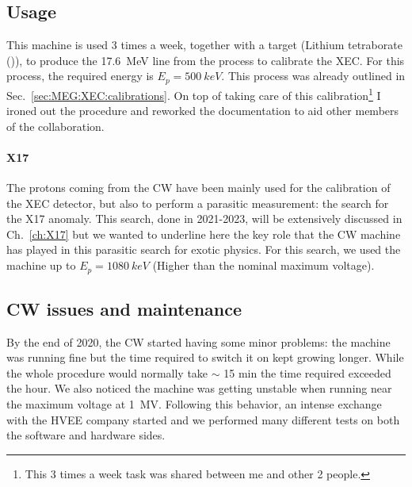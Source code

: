 \begin{refsection}
    \subsection{Usage}
        This machine is used 3 times a week, together with a  target (Lithium tetraborate ()), to produce the \SI{17.6}{MeV} line from the  process to calibrate the XEC. For this process, the required energy is $E_p=\SI{500}{keV}$.
        This process was already outlined in Sec.~\ref{sec:MEG:XEC:calibrations}.
        On top of taking care of this calibration\footnote {This 3 times a week task was shared between me and other 2 people.} 
        I ironed out the procedure and reworked the documentation to aid other members of the collaboration.
        
        \paragraph{X17} The protons coming from the CW have been mainly used for the calibration of the XEC detector, but also to perform a parasitic measurement: the search for the X17 anomaly.
        This search, done in 2021-2023, will be extensively discussed in Ch.~\ref{ch:X17} but we wanted to underline here the key role that the CW machine has played in this parasitic search for exotic physics. 
        For this search, we used the machine up to $E_p=\SI{1080}{keV}$ (Higher than the nominal maximum voltage).

    \subsection{CW issues and maintenance}
        By the end of 2020, the CW started having some minor problems: the machine was running fine but the time required to switch it on kept growing longer.
        While the whole procedure would normally take $\sim$ 15 min the time required exceeded the hour.
        We also noticed the machine was getting unstable when running near the maximum voltage at \SI{1}{MV}.
        Following this behavior, an intense exchange with the HVEE company started and we performed many different tests on both the software and hardware sides.
    

\end{refsection}
